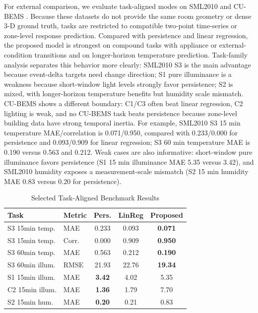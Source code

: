 \documentclass[conference]{IEEEtran}
\begin{document}
For external comparison, we evaluate task-aligned modes on SML2010 \cite{romeu2014sml2010} and CU-BEMS \cite{chitalia2020cubems}. Because these datasets do not provide the same room geometry or dense 3-D ground truth, tasks are restricted to compatible two-point time-series or zone-level response prediction. Compared with persistence and linear regression, the proposed model is strongest on compound tasks with appliance or external-condition transitions and on longer-horizon temperature prediction. Task-family analysis separates this behavior more clearly: SML2010 S3 is the main advantage because event-delta targets need change direction; S1 pure illuminance is a weakness because short-window light levels strongly favor persistence; S2 is mixed, with longer-horizon temperature benefits but humidity scale mismatch. CU-BEMS shows a different boundary: C1/C3 often beat linear regression, C2 lighting is weak, and no CU-BEMS task beats persistence because zone-level building data have strong temporal inertia. For example, SML2010 S3 15 min temperature MAE/correlation is 0.071/0.950, compared with 0.233/0.000 for persistence and 0.093/0.909 for linear regression; S3 60 min temperature MAE is 0.190 versus 0.563 and 0.212. Weak cases are also informative: short-window pure illuminance favors persistence (S1 15 min illuminance MAE 5.35 versus 3.42), and SML2010 humidity exposes a measurement-scale mismatch (S2 15 min humidity MAE 0.83 versus 0.20 for persistence).

\begin{table}[t]
\caption{Selected Task-Aligned Benchmark Results}
\label{tab:benchmark}
\centering
\scriptsize
\begin{tabular}{|l|l|c|c|c|}
\hline
Task & Metric & Pers. & LinReg & Proposed\\
\hline
S3 15min temp. & MAE  & 0.233 & 0.093 & \textbf{0.071}\\
S3 15min temp. & Corr. & 0.000 & 0.909 & \textbf{0.950}\\
S3 60min temp. & MAE  & 0.563 & 0.212 & \textbf{0.190}\\
S3 60min illum. & RMSE & 21.93 & 22.76 & \textbf{19.34}\\
S1 15min illum. & MAE  & \textbf{3.42} & 4.02 & 5.35\\
C2 15min illum. & MAE  & \textbf{1.36} & 1.79 & 7.70\\
S2 15min hum. & MAE  & \textbf{0.20} & 0.21 & 0.83\\
\hline
\end{tabular}
\end{table}
\end{document}
